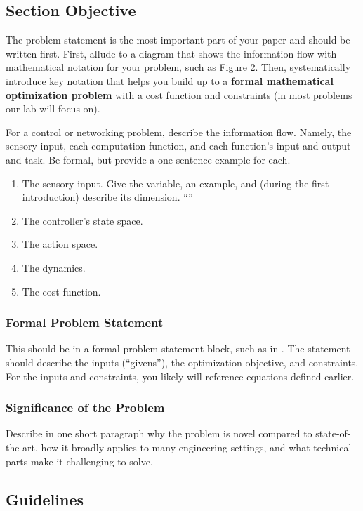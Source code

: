 \subsection{Section Objective}
The problem statement is the most important part of your paper and should be written first. First, allude to a diagram that shows the information flow with mathematical notation for your problem, such as Figure 2.
Then, systematically introduce key notation that helps you build up to a \textbf{formal mathematical optimization problem} with a cost function and constraints (in most problems our lab will focus on).

For a control or networking problem, describe the information flow. 
Namely, the sensory input, each computation function, and each function's input and output and task. Be formal, but provide a one sentence example for each.

\begin{enumerate}
    \item The sensory input.  Give the variable, an example,  and (during the first introduction) describe its dimension. ``''
    \item The controller's state space.
    \item The action space.
    \item The dynamics.
    \item The cost function.
\end{enumerate}

\subsubsection{Formal Problem Statement}
This should be in a formal problem statement block, such as in \cite{}.
The statement should describe the inputs (``givens''), the optimization objective, and constraints. For the inputs and constraints, you likely will reference equations defined earlier. 

\subsubsection{Significance of the Problem}
Describe in one short paragraph why the problem is novel compared to state-of-the-art, how it broadly applies to many engineering settings, and what technical parts make it challenging to solve.

\subsection{Guidelines}


